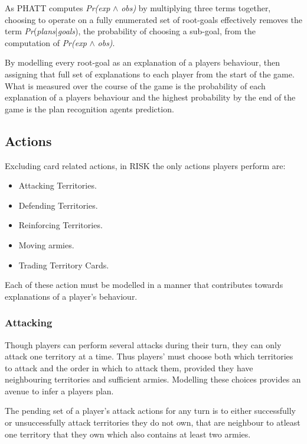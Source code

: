 \documentclass[parskip]{cs4rep}
\begin{document}
As PHATT computes \textit{Pr(exp} $\wedge$ \textit{obs)} by multiplying three terms together, choosing to operate on a fully enumerated set of root-goals effectively removes the term \textit{Pr}(\textit{plans}|\textit{goals}), the probability of choosing a sub-goal, from the computation of \textit{Pr(exp} $\wedge$ \textit{obs)}.

By modelling every root-goal as an explanation of a players behaviour, then assigning that full set of explanations to each player from the start of the game. What is measured over the course of the game is the probability of each explanation of a players behaviour and the highest probability by the end of the game is the plan recognition agents prediction.

\subsection{Actions}

Excluding card related actions, in RISK the only actions players perform are:

\begin{itemize}
\item
Attacking Territories.
\item
Defending Territories.
\item
Reinforcing Territories.
\item
Moving armies.
\item
Trading Territory Cards.
\end{itemize}

Each of these action must be modelled in a manner that contributes towards explanations of a player's behaviour.

\subsubsection{Attacking}

Though players can perform several attacks during their turn, they can only attack one territory at a time. Thus players' must choose both which territories to attack and the order in which to attack them, provided they have neighbouring territories and sufficient armies. Modelling these choices provides an avenue to infer a players plan.

The pending set of a player's attack actions for any turn is to either successfully or unsuccessfully attack territories they do not own, that are neighbour to atleast one territory that they own which also contains at least two armies.
\end{document}
